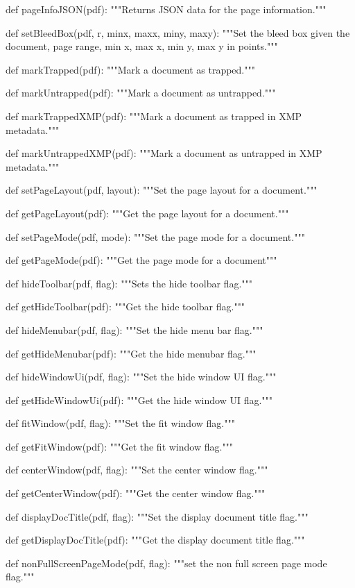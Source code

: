 def pageInfoJSON(pdf):
    """Returns JSON data for the page information."""

def setBleedBox(pdf, r, minx, maxx, miny, maxy):
    """Set the bleed box given the document, page range, min x, max x,
    min y, max y in points."""

def markTrapped(pdf):
    """Mark a document as trapped."""

def markUntrapped(pdf):
    """Mark a document as untrapped."""

def markTrappedXMP(pdf):
    """Mark a document as trapped in XMP metadata."""

def markUntrappedXMP(pdf):
    """Mark a document as untrapped in XMP metadata."""

def setPageLayout(pdf, layout):
    """Set the page layout for a document."""

def getPageLayout(pdf):
    """Get the page layout for a document."""

def setPageMode(pdf, mode):
    """Set the page mode for a document."""

def getPageMode(pdf):
    """Get the page mode for a document"""

def hideToolbar(pdf, flag):
    """Sets the hide toolbar flag."""

def getHideToolbar(pdf):
    """Get the hide toolbar flag."""

def hideMenubar(pdf, flag):
    """Set the hide menu bar flag."""

def getHideMenubar(pdf):
    """Get the hide menubar flag."""

def hideWindowUi(pdf, flag):
    """Set the hide window UI flag."""

def getHideWindowUi(pdf):
    """Get the hide window UI flag."""

def fitWindow(pdf, flag):
    """Set the fit window flag."""

def getFitWindow(pdf):
    """Get the fit window flag."""

def centerWindow(pdf, flag):
    """Set the center window flag."""

def getCenterWindow(pdf):
    """Get the center window flag."""

def displayDocTitle(pdf, flag):
    """Set the display document title flag."""

def getDisplayDocTitle(pdf):
    """Get the display document title flag."""

def nonFullScreenPageMode(pdf, flag):
    """set the non full screen page mode flag."""

